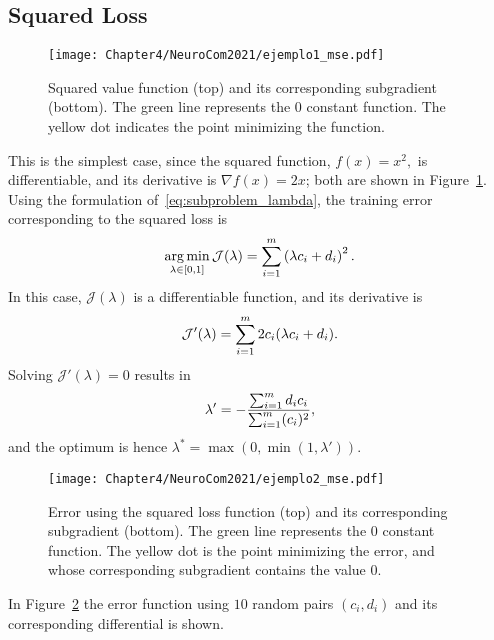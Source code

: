 \subsection{Squared Loss}
\begin{figure}[t!]
    \centering
    \texttt{[image: Chapter4/NeuroCom2021/ejemplo1\_mse.pdf]}
    \caption{Squared value function (top) and its corresponding subgradient (bottom). The green line represents the $0$ constant function. The yellow dot indicates the point minimizing the function.}
    \label{fig:sq_loss}
\end{figure}
This is the simplest case, since the squared function,
$f(x) = x^2 ,$
is differentiable, and its derivative is 
$\nabla f(x) = 2x$; both are shown in Figure~\ref{fig:sq_loss}.
Using the formulation of~\eqref{eq:subproblem_lambda}, the training error corresponding to the squared loss is
\begin{equation}
    \nonumber
    \operatorname*{arg\min}_{\lambda \in [0, 1]} \mathcal{J}(\lambda) = \sum_{i=1}^{m} \left({\lambda c_i + d_i}\right)^2 .
\end{equation}
In this case, $\mathcal{J}(\lambda)$ is a differentiable function, and its derivative is 
\begin{equation}
    \nonumber
    \mathcal{J}'(\lambda) = \sum_{i=1}^m 2 c_i (\lambda c_i + d_i) .
\end{equation}
Solving $\mathcal{J}'(\lambda)= 0$ results in
%
\begin{equation*}
\lambda' =  -\frac{\sum_{i=1}^{m} d_i c_i }{\sum_{i=1}^{m} (c_i)^2 } ,
\end{equation*}
and the optimum is hence $\lambda^* = \max(0, \min(1, \lambda'))$.
\begin{figure}[t!]
    \centering
    \texttt{[image: Chapter4/NeuroCom2021/ejemplo2\_mse.pdf]}
    \caption{Error using the squared loss function (top) and its corresponding subgradient (bottom). The green line represents the $0$ constant function. The yellow dot is the point minimizing the error, and whose corresponding subgradient contains the value $0$.}
    \label{fig:sq_error}
\end{figure}

In Figure~\ref{fig:sq_error} the error function using $10$ random pairs $(c_i, d_i)$ and its corresponding differential is shown.

